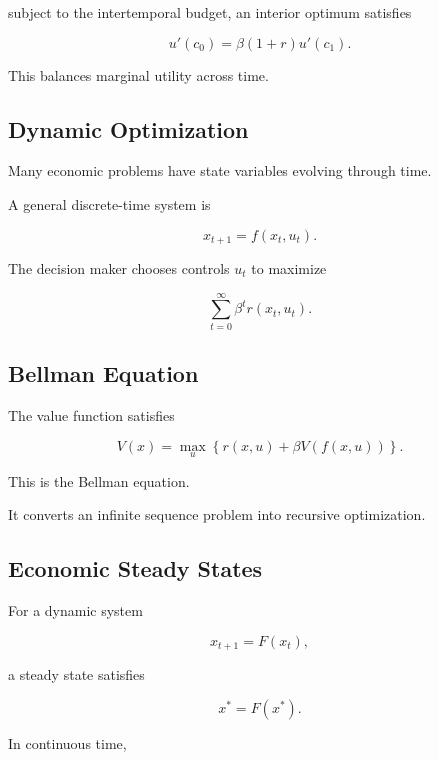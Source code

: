 subject to the intertemporal budget, an interior optimum satisfies

\[
\boxed{
u'(c_0)
=
\beta(1+r)u'(c_1).
}
\]

This balances marginal utility across time.

\subsection{Dynamic Optimization}
\label{subsec:dynamic-economic-optimization}

Many economic problems have state variables evolving through time.

A general discrete-time system is

\[
\boxed{
x_{t+1}
=
f(x_t,u_t).
}
\]

The decision maker chooses controls \(u_t\) to maximize

\[
\boxed{
\sum_{t=0}^{\infty}
\beta^t
r(x_t,u_t).
}
\]

\subsection{Bellman Equation}
\label{subsec:economic-bellman-equation}

The value function satisfies

\[
\boxed{
V(x)
=
\max_u
\left\{
r(x,u)
+
\beta V(f(x,u))
\right\}.
}
\]

This is the Bellman equation.

It converts an infinite sequence problem into recursive optimization.

\subsection{Economic Steady States}
\label{subsec:economic-steady-states}

For a dynamic system

\[
x_{t+1}
=
F(x_t),
\]

a steady state satisfies

\[
\boxed{
x^*
=
F(x^*).
}
\]

In continuous time,

